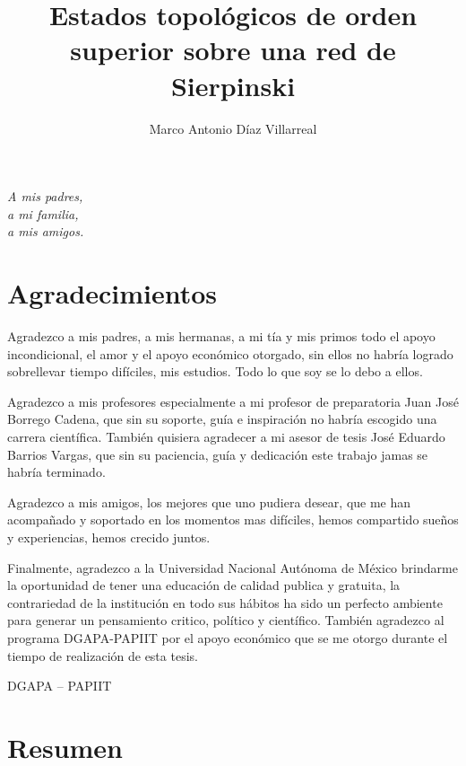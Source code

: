 \documentclass[letterpaper,12pt,oneside]{book}
\author{Marco Antonio Díaz Villarreal}
\title{Estados topológicos de orden superior sobre una red de Sierpinski}
\begin{document}
\frontmatter
\maketitle
\chapter*{}
\begin{flushright}%
  \emph{A mis padres,\\ a mi familia,\\ a mis amigos.}
  \thispagestyle{empty}
\end{flushright}

\chapter{Agradecimientos}

Agradezco a mis padres, a mis hermanas, a mi tía y mis primos todo el apoyo incondicional, el amor y el apoyo económico otorgado, sin ellos no habría logrado sobrellevar tiempo difíciles, mis estudios. Todo lo que soy se lo debo a ellos. 

Agradezco a mis profesores especialmente a mi profesor de preparatoria Juan José Borrego Cadena, que sin su soporte, guía e inspiración no habría escogido una carrera científica. También quisiera agradecer a mi asesor de tesis José Eduardo Barrios Vargas, que sin su paciencia, guía y dedicación este trabajo jamas se habría terminado.

Agradezco a mis amigos, los mejores que uno pudiera desear, que me han acompañado y soportado en los momentos mas difíciles, hemos compartido sueños y experiencias, hemos crecido juntos.

Finalmente, agradezco a la Universidad Nacional Autónoma de México brindarme la oportunidad de tener una educación de calidad publica y gratuita, la contrariedad de la institución en todo sus hábitos ha sido un perfecto ambiente para generar un pensamiento critico, político y científico. También agradezco al programa DGAPA-PAPIIT por el apoyo económico que se me otorgo durante el tiempo de realización de esta tesis.

DGAPA -- PAPIIT
\chapter{Resumen}



\tableofcontents

    
\mainmatter


% 
%


%
%


%
%



%
%



%
%





\backmatter%
\end{document}
